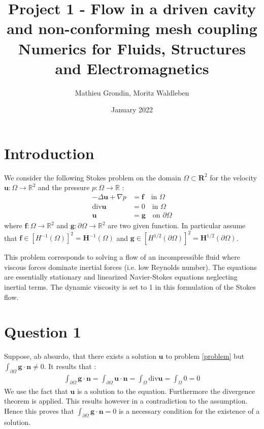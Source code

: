 \documentclass{article}
\title{%
  Project 1 - Flow in a driven cavity and non-conforming mesh coupling \\
  \bigskip
  \large Numerics for Fluids, Structures and Electromagnetics}
\author{Mathieu Grondin, Moritz Waldleben}
\date{January 2022}
\begin{document}
\maketitle

\section*{Introduction}
We consider the following Stokes problem on the domain $\Omega \subset
\mathbf{R}^2$ for the velocity $\mathbf{u} : \Omega \rightarrow \mathbb{R}^2$
and the pressure $p:\Omega \rightarrow \mathbb{R}$ :
\begin{align} \label{problem} 
    -\Delta \mathbf{u} + \nabla p &= \mathbf{f}  \quad\textrm{in } \Omega\nonumber\\ 
    \textrm{div} \mathbf{u} &= 0 \quad \textrm{in } \Omega \\
    \mathbf{u} &= \mathbf{g} \quad \textrm{on } \partial \Omega  \nonumber
\end{align}
where $\mathbf{f} : \Omega \rightarrow \mathbb{R}^2$ and $\mathbf{g} :
\partial\Omega\rightarrow\mathbb{R}^2$ are two given function. In particular
assume that $\mathbf{f} \in [H^{-1}(\Omega)]^2=\mathbf{H}^{-1}(\Omega)$ and
$\mathbf{g} \in [H^{1/2}(\partial\Omega)]^2=\mathbf{H}^{1/2}(\partial\Omega)$.

This problem corresponds to solving a flow of an incompressible fluid where
viscous forces dominate inertial forces (i.e. low Reynolds number). The
equations are essentially stationary and linearized Navier-Stokes equations
neglecting inertial terms. The dynamic viscosity is set to 1 in this
formulation of the Stokes flow.

\section{Question 1}
Suppose, ab absurdo, that there exists a solution $\mathbf{u}$ to problem \ref{problem} but \\
$\int_{\partial\Omega}\mathbf{g}\cdot\mathbf{n} \neq 0$. It results that : 
\begin{align*}
    \int_{\partial\Omega}\mathbf{g}\cdot\mathbf{n} = \int_{\partial\Omega}\mathbf{u}\cdot \mathbf{n} = \int_{\Omega}\textrm{div}\mathbf{u}=\int_{\Omega}0=0 
\end{align*}
We use the fact that $\mathbf{u}$ is a solution to the equation. Furthermore
the divergence theorem is applied. This results however in a contradiction to
the assumption. Hence this proves that  $\int_{\partial\Omega}
\mathbf{g}\cdot\mathbf{n}=0$ is a necessary condition for the existence of a
solution.
\end{document}
